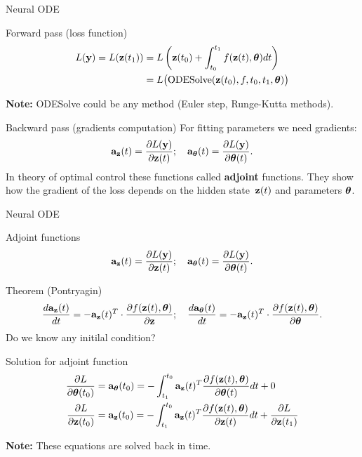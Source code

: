 \begin{frame}{Neural ODE}
	\begin{block}{Forward pass (loss function)}
		\vspace{-0.8cm}
		\begin{align*}
			L(\mathbf{y}) = L(\mathbf{z}(t_1)) &= L\left( \mathbf{z}(t_0) + \int_{t_0}^{t_1} f(\mathbf{z}(t), \boldsymbol{\theta}) dt \right) \\ &= L\bigl(\text{ODESolve}(\mathbf{z}(t_0), f, t_0,t_1, \boldsymbol{\theta}) \bigr)
		\end{align*}
	\vspace{-0.5cm}
	\end{block}
	\textbf{Note:} ODESolve could be any method (Euler step, Runge-Kutta methods).
	\begin{block}{Backward pass (gradients computation)}
		For fitting parameters we need gradients:
		\[
			\mathbf{a}_{\mathbf{z}}(t) = \frac{\partial L(\mathbf{y})}{\partial \mathbf{z}(t)}; \quad \mathbf{a}_{\boldsymbol{\theta}}(t) = \frac{\partial L(\mathbf{y})}{\partial \boldsymbol{\theta}(t)}.
		\]
		In theory of optimal control these functions called \textbf{adjoint} functions. 
		They show how the gradient of the loss depends on the hidden state~$\mathbf{z}(t)$ and parameters $\boldsymbol{\theta}$.
	\end{block}

\end{frame}
\begin{frame}{Neural ODE}
	\begin{block}{Adjoint functions}
		\vspace{-0.3cm}
		\[
			\mathbf{a}_{\mathbf{z}}(t) = \frac{\partial L(\mathbf{y})}{\partial \mathbf{z}(t)}; \quad \mathbf{a}_{\boldsymbol{\theta}}(t) = \frac{\partial L(\mathbf{y})}{\partial \boldsymbol{\theta}(t)}.
		\]
		\vspace{-0.6cm}
	\end{block}
	\begin{block}{Theorem (Pontryagin)}
	\vspace{-0.6cm}
	\[
	     \frac{d \mathbf{a}_{\mathbf{z}}(t)}{dt} = - \mathbf{a}_{\mathbf{z}}(t)^T \cdot \frac{\partial f(\mathbf{z}(t), \boldsymbol{\theta})}{\partial \mathbf{z}}; \quad \frac{d \mathbf{a}_{\boldsymbol{\theta}}(t)}{dt} = - \mathbf{a}_{\mathbf{z}}(t)^T \cdot \frac{\partial f(\mathbf{z}(t), \boldsymbol{\theta})}{\partial \boldsymbol{\theta}}.
	\]
	Do we know any initilal condition?
	\end{block}
	\begin{block}{Solution for adjoint function}
		\vspace{-0.8cm}
		\begin{align*}
			 \frac{\partial L}{\partial \boldsymbol{\theta}(t_0)} &= \mathbf{a}_{\boldsymbol{\theta}}(t_0) =  - \int_{t_1}^{t_0} \mathbf{a}_{\mathbf{z}}(t)^T \frac{\partial f(\mathbf{z}(t), \boldsymbol{\theta})}{\partial \boldsymbol{\theta}(t)} dt + 0\\
			 \frac{\partial L}{\partial \mathbf{z}(t_0)} &= \mathbf{a}_{\mathbf{z}}(t_0) =  - \int_{t_1}^{t_0} \mathbf{a}_{\mathbf{z}}(t)^T \frac{\partial f(\mathbf{z}(t), \boldsymbol{\theta})}{\partial \mathbf{z}(t)} dt + \frac{\partial L}{\partial \mathbf{z}(t_1)}\\
		\end{align*}
		\vspace{-1.5cm}
	\end{block}
	\textbf{Note:} These equations are solved back in time.
\end{frame}
